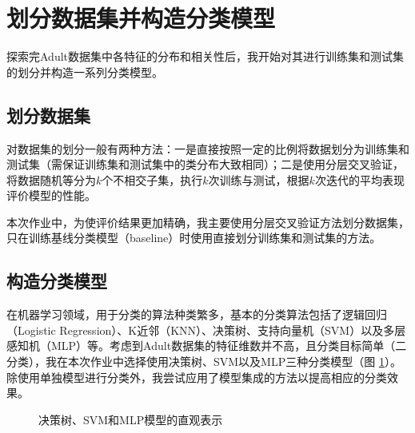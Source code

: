 \documentclass[12pt,a4paper]{article}
\theoremstyle{definition}
\begin{document}
\section{划分数据集并构造分类模型}

探索完Adult数据集中各特征的分布和相关性后，我开始对其进行训练集和测试集的划分并构造一系列分类模型。

\subsection{划分数据集}

对数据集的划分一般有两种方法：一是直接按照一定的比例将数据划分为训练集和测试集（需保证训练集和测试集中的类分布大致相同）；二是使用分层交叉验证，将数据随机等分为$k$个不相交子集，执行$k$次训练与测试，根据$k$次迭代的平均表现评价模型的性能。

\vspace{0.01\linewidth}
本次作业中，为使评价结果更加精确，我主要使用分层交叉验证方法划分数据集，只在训练基线分类模型（baseline）时使用直接划分训练集和测试集的方法。

\subsection{构造分类模型}

在机器学习领域，用于分类的算法种类繁多，基本的分类算法包括了逻辑回归（Logistic Regression）、K近邻（KNN）、决策树、支持向量机（SVM）以及多层感知机（MLP）等。考虑到Adult数据集的特征维数并不高，且分类目标简单（二分类），我在本次作业中选择使用决策树、SVM以及MLP三种分类模型（图 \ref{fig:model-init}）。除使用单独模型进行分类外，我尝试应用了模型集成的方法以提高相应的分类效果。

\begin{figure}[H]
	\centering
	\caption{决策树、SVM和MLP模型的直观表示}
	\label{fig:model-init}
\end{figure}
\end{document}
